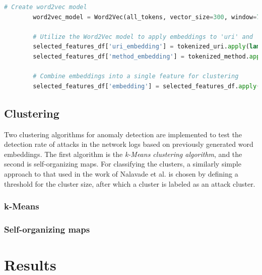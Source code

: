 \documentclass[
    fontsize=12pt,
    headings=small,
    parskip=half,           %
    bibliography=totoc,
    numbers=noenddot,       %
    open=any,               %
    ]{scrreprt}
\begin{document}
\begin{minipage}\linewidth
	\begin{lstlisting}[language={python}, caption={Creation of Word2Vec model and word embeddings}, label={lst:word2vec}] 
		# Create word2vec model
		word2vec_model = Word2Vec(all_tokens, vector_size=300, window=7, min_count=1, workers=4)
		
		# Utilize the Word2Vec model to apply embeddings to 'uri' and 'method' values
		selected_features_df['uri_embedding'] = tokenized_uri.apply(lambda x: sum(word2vec_model.wv[t] for t in x))
		selected_features_df['method_embedding'] = tokenized_method.apply(lambda x: sum(word2vec_model.wv[t] for t in x))
		
		# Combine embeddings into a single feature for clustering
		selected_features_df['embedding'] = selected_features_df.apply(lambda row: row['uri_embedding'] + row['method_embedding'], axis=1)
	\end{lstlisting}
\end{minipage}

\subsection{Clustering}
Two clustering algorithms for anomaly detection are implemented to test the detection rate of attacks in the network logs based on previously generated word embeddings. The first algorithm is the \emph{k-Means clustering algorithm}, and the second is self-organizing maps. For classifying the clusters, a similarly simple approach to that used in the work of Nalavade et al. \cite{nalavade2014} is chosen by defining a threshold for the cluster size, after which a cluster is labeled as an attack cluster.

\subsubsection{k-Means}

\subsubsection{Self-organizing maps}

\section{Results}
\end{document}
